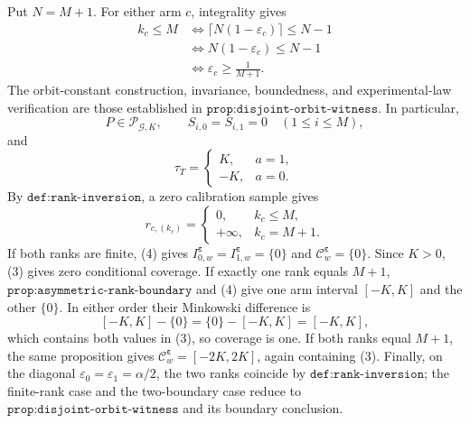 Put \(N=M+1\). For either arm \(c\), integrality gives
\[
\begin{aligned}
k_c\le M&\Longleftrightarrow \lceil N(1-\varepsilon_c)\rceil\le N-1\\
&\Longleftrightarrow N(1-\varepsilon_c)\le N-1\\
&\Longleftrightarrow \varepsilon_c\ge\frac1{M+1}.
\end{aligned}
\tag{1}
\]
The orbit-constant construction, invariance, boundedness, and experimental-law verification are those established in \(\texttt{prop:disjoint-orbit-witness}\). In particular,
\[
P\in\mathcal P_{\mathcal G,K},\qquad S_{i,0}=S_{i,1}=0\quad(1\le i\le M),
\tag{2}
\]
and
\[
\tau_T=\begin{cases}K,&a=1,\\-K,&a=0.\end{cases}
\tag{3}
\]
By \(\texttt{def:rank-inversion}\), a zero calibration sample gives
\[
r_{c,(k_c)}=\begin{cases}0,&k_c\le M,\\+\infty,&k_c=M+1.\end{cases}
\tag{4}
\]
If both ranks are finite, (4) gives \(I^{\boldsymbol\varepsilon}_{0,w}=I^{\boldsymbol\varepsilon}_{1,w}=\{0\}\) and \(\mathcal C^{\boldsymbol\varepsilon}_w=\{0\}\). Since \(K>0\), (3) gives zero conditional coverage. If exactly one rank equals \(M+1\), \(\texttt{prop:asymmetric-rank-boundary}\) and (4) give one arm interval \([-K,K]\) and the other \(\{0\}\). In either order their Minkowski difference is
\[
[-K,K]-\{0\}=\{0\}-[-K,K]=[-K,K],
\tag{5}
\]
which contains both values in (3), so coverage is one. If both ranks equal \(M+1\), the same proposition gives \(\mathcal C^{\boldsymbol\varepsilon}_w=[-2K,2K]\), again containing (3). Finally, on the diagonal \(\varepsilon_0=\varepsilon_1=\alpha/2\), the two ranks coincide by \(\texttt{def:rank-inversion}\); the finite-rank case and the two-boundary case reduce to \(\texttt{prop:disjoint-orbit-witness}\) and its boundary conclusion.